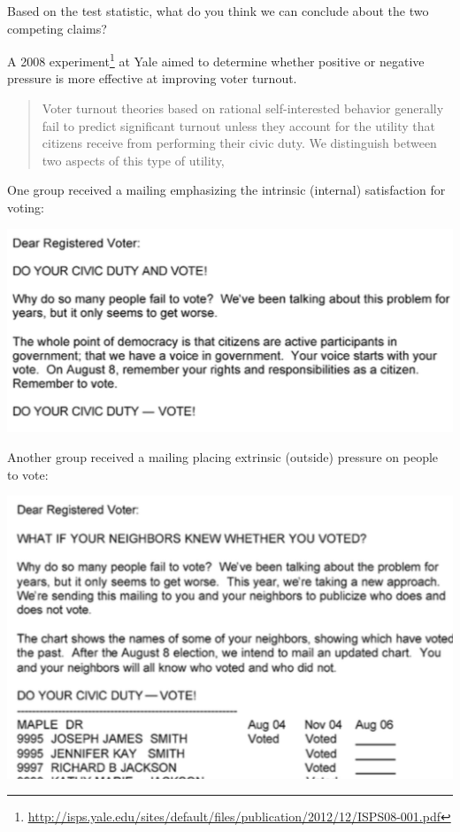  \vfill

\ii Based on the test statistic, what do you think we can conclude about the two competing claims?
 \vfill
\ee
\ee

\clearpage


\bb[resume]
\ii A 2008 experiment\footnote{\href{http://isps.yale.edu/sites/default/files/publication/2012/12/ISPS08-001.pdf}{\underline{http://isps.yale.edu/sites/default/files/publication/2012/12/ISPS08-001.pdf}}}
at Yale aimed to determine whether positive or negative pressure is more effective at improving voter turnout.

\begin{quote}
Voter turnout theories based on rational self-interested behavior generally fail to predict significant turnout unless they account for the utility that citizens receive from performing their civic duty. We distinguish between two aspects of this type of utility, 
\end{quote}

\begin{multicols}{2}
One group received a mailing emphasizing the intrinsic (internal) satisfaction for voting:

\includegraphics[width=0.48\tw]{18/fig-intrinsic.png}


\columnbreak

Another group received a mailing placing extrinsic (outside) pressure on people to vote:

\includegraphics[width=0.48\tw]{18/fig-extrinsic.png}

\end{multicols}

